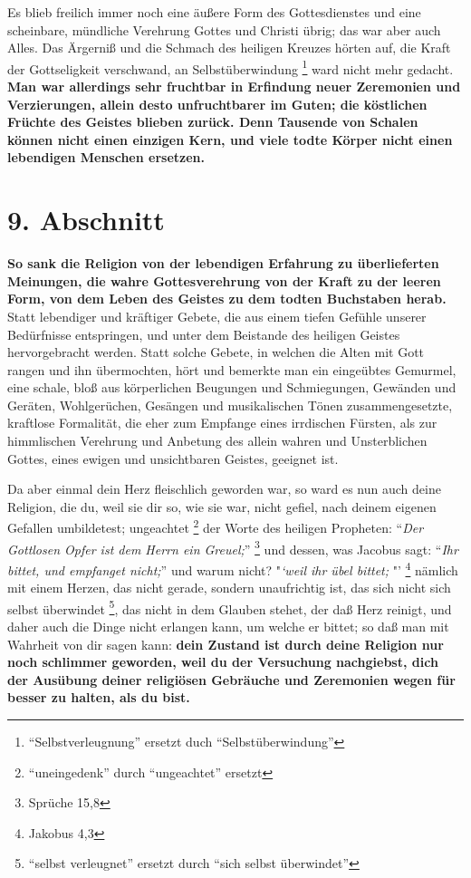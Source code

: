 \medskip 

Es blieb freilich immer noch eine äußere Form des Gottesdienstes und eine
scheinbare, mündliche Verehrung Gottes und Christi übrig; das war aber auch
Alles. Das Ärgerniß und die Schmach des heiligen Kreuzes hörten auf, die Kraft
der Gottseligkeit verschwand, an Selbstüberwindung
\footnote{"`Selbstverleugnung"' ersetzt duch "`Selbstüberwindung"'}
ward nicht mehr gedacht. \textbf{Man
war allerdings sehr fruchtbar in Erfindung neuer Zeremonien und Verzierungen,
allein desto unfruchtbarer im Guten; die köstlichen Früchte des Geistes blieben
zurück. Denn Tausende von Schalen können nicht einen einzigen Kern, und viele
todte Körper nicht einen lebendigen Menschen ersetzen.}

\section{9. Abschnitt}

\textbf{So sank die Religion von der lebendigen Erfahrung zu überlieferten
Meinungen,
die wahre Gottesverehrung von der Kraft zu der leeren Form, von dem Leben des
Geistes zu dem todten Buchstaben herab.} Statt lebendiger und kräftiger Gebete,
die aus einem tiefen Gefühle unserer Bedürfnisse entspringen, und unter dem
Beistande des heiligen Geistes hervorgebracht werden. Statt solche Gebete,
in welchen die Alten mit Gott rangen und ihn übermochten,
hört und bemerkte man ein
eingeübtes Gemurmel, eine schale, bloß aus körperlichen Beugungen und
Schmiegungen, Gewänden und Geräten, Wohlgerüchen, Gesängen und musikalischen
Tönen zusammengesetzte, kraftlose Formalität, die eher zum Empfange eines
irrdischen Fürsten, als zur himmlischen Verehrung und Anbetung des allein wahren
und Unsterblichen Gottes, eines ewigen und unsichtbaren Geistes, geeignet ist.

\medskip 

Da aber einmal dein Herz fleischlich geworden war, so ward es nun auch deine
Religion, die du, weil sie dir so, wie sie war, nicht gefiel, nach deinem
eigenen Gefallen umbildetest; ungeachtet \footnote{"`uneingedenk"' durch
"`ungeachtet"' ersetzt} der Worte des heiligen Propheten:
"`\textit{Der Gottlosen Opfer ist dem Herrn ein Greuel;}"'
\footnote{Sprüche 15,8}  und
dessen, was Jacobus sagt: "`\textit{Ihr bittet, und empfanget nicht;}"' und warum
nicht? "\textit{`weil ihr übel bittet;} "' \footnote{Jakobus 4,3}
 nämlich mit einem
Herzen, das nicht gerade, sondern unaufrichtig ist, das sich nicht sich
selbst überwindet \footnote{"`selbst verleugnet"' ersetzt durch "`sich
selbst überwindet"'}, das nicht in dem Glauben stehet, der daß Herz reinigt,
und daher
auch die Dinge nicht erlangen kann, um welche er bittet; so daß man mit
Wahrheit von dir sagen kann: \textbf{dein Zustand ist durch deine Religion nur noch
schlimmer geworden, weil du der Versuchung nachgiebst, dich der Ausübung
deiner religiösen Gebräuche und Zeremonien wegen für besser zu halten, als du
bist.}

